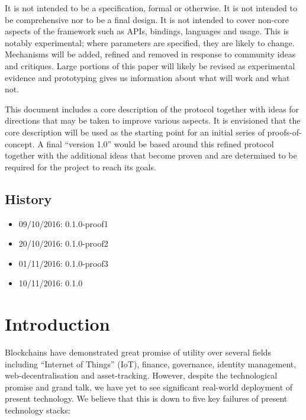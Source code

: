 \documentclass{beamer}
\begin{document}
\begin{frame}
 It is not intended to be a specification, formal or otherwise. It is not intended to be comprehensive nor to be a final design. It is not intended to cover non-core aspects of the framework such as APIs, bindings, languages and usage. This is notably experimental; where parameters are specified, they are likely to change. Mechanisms will be added, refined and removed in response to community ideas and critiques. Large portions of this paper will likely be revised as experimental evidence and prototyping gives us information about what will work and what not.

 This document includes a core description of the protocol together with ideas for directions that may be taken to improve various aspects. It is envisioned that the core description will be used as the starting point for an initial series of proofs-of-concept. A final ``version 1.0'' would be based around this refined protocol together with the additional ideas that become proven and are determined to be required for the project to reach its goals.

\subsection{History}\label{history}

\begin{itemize}
\item 09/10/2016: 0.1.0-proof1
\item 20/10/2016: 0.1.0-proof2
\item 01/11/2016: 0.1.0-proof3
\item 10/11/2016: 0.1.0
\end{itemize}

\section{Introduction}\label{introduction}

 Blockchains have demonstrated great promise of utility over several fields including ``Internet of Things'' (IoT), finance, governance, identity management, web-decentralisation and asset-tracking. However, despite the technological promise and grand talk, we have yet to see significant real-world deployment of present technology. We believe that this is down to five key failures of present technology stacks:


\end{frame}
\end{document}
